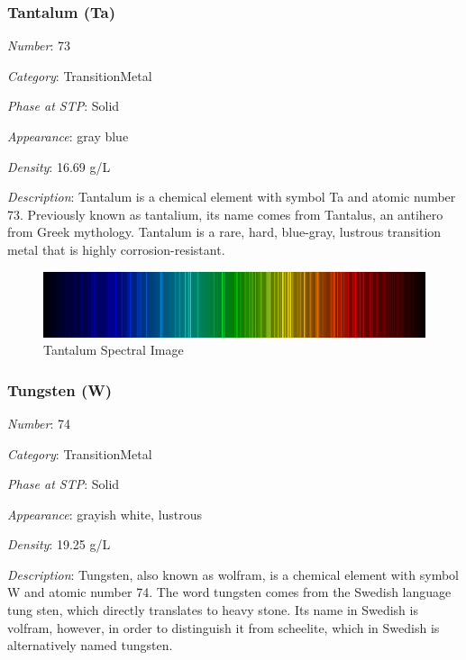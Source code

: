 \documentclass{article}
\begin{document}
\hypertarget{subsubsection::Ta}{}\subsubsection{Tantalum (Ta)}

\textit{Number}: 73

\textit{Category}: TransitionMetal

\textit{Phase at STP}: Solid

\textit{Appearance}: gray blue

\textit{Density}: 16.69 g/L

\textit{Description}: Tantalum is a chemical element with symbol Ta and atomic number 73. Previously known as tantalium, its name comes from Tantalus, an antihero from Greek mythology. Tantalum is a rare, hard, blue-gray, lustrous transition metal that is highly corrosion-resistant.

\immediate{}
\begin{figure}[!ht]
    \centering
    \includegraphics[width=12cm]{./resources/spectral_img/Tantalum_spectrum_visible.png}
    \caption{Tantalum Spectral Image}
\end{figure}

\hypertarget{subsubsection::W}{}\subsubsection{Tungsten (W)}

\textit{Number}: 74

\textit{Category}: TransitionMetal

\textit{Phase at STP}: Solid

\textit{Appearance}: grayish white, lustrous

\textit{Density}: 19.25 g/L

\textit{Description}: Tungsten, also known as wolfram, is a chemical element with symbol W and atomic number 74. The word tungsten comes from the Swedish language tung sten, which directly translates to heavy stone. Its name in Swedish is volfram, however, in order to distinguish it from scheelite, which in Swedish is alternatively named tungsten.
\end{document}

